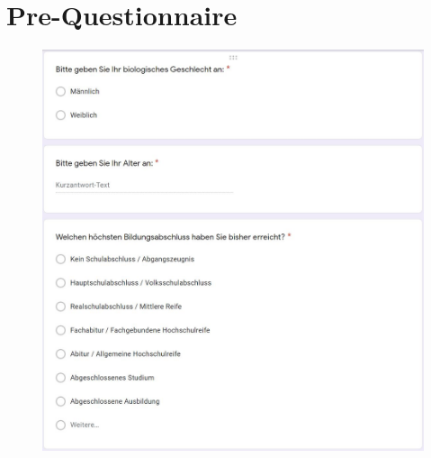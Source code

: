 \documentclass[a4paper,11pt]{article}%
\renewcommand{\\}{\vspace*{0.5\baselineskip} \newline}
\begin{document}
	
	\section{Pre-Questionnaire}
	\label{Pre-Questionnaire}
	
	\begin{figure}[H]
		\begin{footnotesize}
			\includegraphics[width=\textwidth]{Abbildungen/Fragebogen/Pre-Questionnaire/PQ1}\\
		\end{footnotesize}
	\end{figure}	
	
\end{document}
